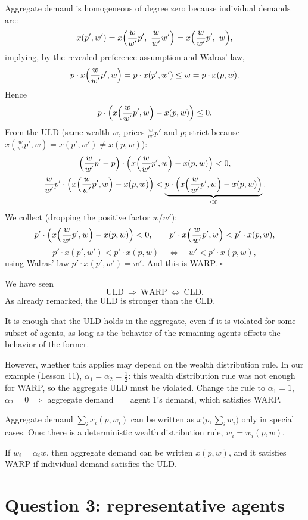 \documentclass[11pt]{article}
\begin{document}
Aggregate demand is homogeneous of degree zero because individual demands are:
\[ x(p',w')=x\Bigl(\frac{w}{w'}p',\ \frac{w}{w'}w'\Bigr)=x\Bigl(\frac{w}{w'}p',\ w\Bigr), \]
implying, by the revealed-preference assumption and Walras' law,
\[ p\cdot x\Bigl(\frac{w}{w'}p',w\Bigr)=p\cdot x(p',w')\le w=p\cdot x(p,w). \]
Hence
\[ p\cdot\Bigl(x\Bigl(\frac{w}{w'}p',w\Bigr)-x(p,w)\Bigr)\le 0. \]
From the ULD (same wealth $w$, prices $\tfrac{w}{w'}p'$ and $p$; strict because
$x(\tfrac{w}{w'}p',w)=x(p',w')\ne x(p,w)$):
\[ \Bigl(\frac{w}{w'}p'-p\Bigr)\cdot\Bigl(x\Bigl(\frac{w}{w'}p',w\Bigr)-x(p,w)\Bigr)<0, \]
\[ \frac{w}{w'}p'\cdot\Bigl(x\Bigl(\frac{w}{w'}p',w\Bigr)-x(p,w)\Bigr)
   < \underbrace{p\cdot\Bigl(x\Bigl(\frac{w}{w'}p',w\Bigr)-x(p,w)\Bigr)}_{\le 0}. \]
We collect (dropping the positive factor $w/w'$):
\[ p'\cdot\Bigl(x\Bigl(\frac{w}{w'}p',w\Bigr)-x(p,w)\Bigr)<0, \qquad
   p'\cdot x\Bigl(\frac{w}{w'}p',w\Bigr)<p'\cdot x(p,w), \]
\[ p'\cdot x(p',w')<p'\cdot x(p,w)\quad\Longleftrightarrow\quad w'<p'\cdot x(p,w), \]
using Walras' law $p'\cdot x(p',w')=w'$. And this is WARP. \hfill$\square$

We have seen
\[ \text{ULD}\ \Longrightarrow\ \text{WARP}\ \Longleftrightarrow\ \text{CLD}. \]
As already remarked, the ULD is stronger than the CLD.

 It is enough that the ULD holds in the aggregate, even if it is
violated for some subset of agents, as long as the behavior of the remaining
agents offsets the behavior of the former.

However, whether this applies may depend on the wealth distribution rule. In our
example (Lesson 11), $\alpha_1=\alpha_2=\tfrac12$: this wealth distribution rule
was not enough for WARP, so the aggregate ULD must be violated. Change the rule to
$\alpha_1=1$, $\alpha_2=0$ $\Rightarrow$ aggregate demand $=$ agent 1's demand,
which satisfies WARP.

\begin{flatnum}
  \item Aggregate demand $\sum_i x_i(p,w_i)$ can be written as
        $x\bigl(p,\sum_i w_i\bigr)$ only in special cases. One: there is a
        deterministic wealth distribution rule, $w_i=w_i(p,w)$.
  \item If $w_i=\alpha_i w$, then aggregate demand can be written $x(p,w)$, and it
        satisfies WARP if individual demand satisfies the ULD.
\end{flatnum}


\section{Question 3: representative agents}
\end{document}
